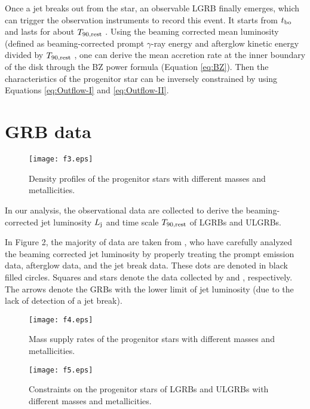 \documentclass[twocolumn]{aastex6}
\begin{document}
Once a jet breaks out from the star, an observable LGRB finally emerges, which can trigger the observation instruments to record this event. It starts from $t_{\rm bo}$ and lasts for about $T_{{90}, \rm rest}$ \citep[e.g.,][the rest-frame duration can be expressed by $T_{{90}, \rm rest} = T_{90}/(1+z)$, where $z$ is the redshift]{Bromberg2012}. Using the beaming corrected mean luminosity (defined as beaming-corrected prompt $\gamma$-ray energy and afterglow kinetic energy divided by $T_{{90}, \rm rest}$ \citep[e.g.,][]{Yi2017}, one can derive the mean accretion rate at the inner boundary of the disk through the BZ power formula (Equation \ref{eq:BZ}). Then the characteristics of the progenitor star can be inversely constrained by using Equations \ref{eq:Outflow-I} and \ref{eq:Outflow-II}.

\section{GRB data}

\begin{figure}
\texttt{[image: f3.eps]}
\caption{Density profiles of the progenitor stars with different masses and metallicities.}
\label{fig3}
\end{figure}

In our analysis, the observational data are collected to derive the beaming-corrected jet luminosity $L_{\rm j}$ and time scale $T_{\rm 90,rest}$ of LGRBs and ULGRBs.

In Figure 2, the majority of data are taken from \citet{Yi2017}, who have carefully analyzed the beaming corrected jet luminosity by properly treating the prompt emission data, afterglow data, and the jet break data. These dots are denoted in black filled circles. Squares and stars denote the data collected by \citet{Irwin2016} and \citet{Levan2014}, respectively. The arrows denote the GRBs with the lower limit of jet luminosity (due to the lack of detection of a jet break).

\begin{figure}
\texttt{[image: f4.eps]}
\caption{Mass supply rates of the progenitor stars with different masses and metallicities.}
\label{fig4}
\end{figure}

\begin{figure*}
\centering
\texttt{[image: f5.eps]}
\caption{Constraints on the progenitor stars of LGRBs and ULGRBs with different masses and metallicities.}
\label{fig5}
\end{figure*}
\end{document}
